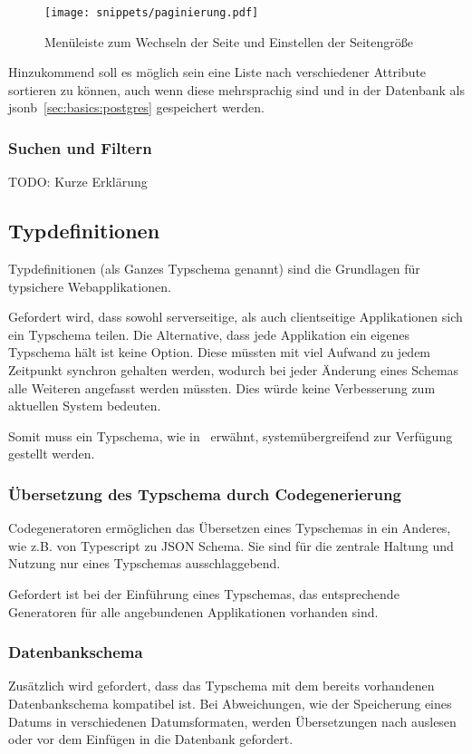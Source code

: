 \begin{figure}[h!]
    \centering
    \texttt{[image: snippets/paginierung.pdf]}
    \caption{Menüleiste zum Wechseln der Seite und Einstellen der Seitengröße}
    \label{req:view:pagination}
\end{figure}

Hinzukommend soll es möglich sein eine Liste nach verschiedener Attribute sortieren zu können, auch wenn diese mehrsprachig sind und
in der Datenbank als jsonb~\ref{sec:basics:postgres} gespeichert werden.

\subsubsection{Suchen und Filtern}
TODO: Kurze Erklärung

\subsection{Typdefinitionen}

Typdefinitionen (als Ganzes Typschema genannt) sind die Grundlagen für typsichere Webapplikationen.

Gefordert wird, dass sowohl serverseitige, als auch clientseitige Applikationen sich ein Typschema teilen. 
Die Alternative, dass jede Applikation ein eigenes Typschema hält ist keine Option. Diese müssten mit viel Aufwand zu jedem Zeitpunkt synchron gehalten werden, wodurch bei jeder Änderung eines Schemas alle Weiteren angefasst werden müssten. Dies würde keine Verbesserung zum aktuellen System bedeuten.

Somit muss ein Typschema, wie in~ erwähnt, systemübergreifend zur Verfügung gestellt werden.

\subsubsection{Übersetzung des Typschema durch Codegenerierung}
Codegeneratoren ermöglichen das Übersetzen eines Typschemas in ein Anderes, wie z.B. von Typescript zu JSON Schema.
Sie sind für die zentrale Haltung und Nutzung nur eines Typschemas ausschlaggebend.

Gefordert ist bei der Einführung eines Typschemas, das entsprechende Generatoren für alle angebundenen Applikationen vorhanden sind.

\subsubsection{Datenbankschema}
Zusätzlich wird gefordert, dass das Typschema mit dem bereits vorhandenen Datenbankschema kompatibel ist.
Bei Abweichungen, wie der Speicherung eines Datums in verschiedenen Datumsformaten,
werden Übersetzungen nach auslesen oder vor dem Einfügen in die Datenbank gefordert.

